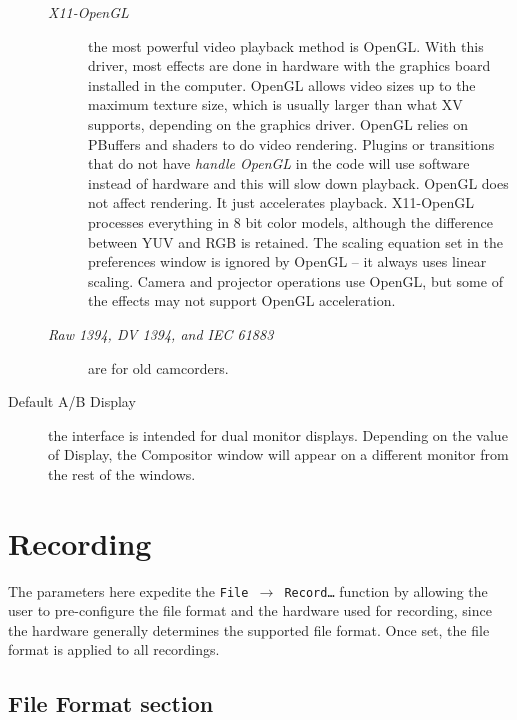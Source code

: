 \begin{description}
\begin{description}
        \item[\textit{X11-OpenGL}] the most powerful video playback method is OpenGL. With this driver, most effects are done in hardware with the graphics board installed in the computer. OpenGL allows video sizes up to the maximum texture size, which is usually larger than what XV supports, depending on the graphics driver.  OpenGL relies on PBuffers and shaders to do video rendering.  Plugins or transitions that do not  have \textit{handle OpenGL} in the code will use software instead of hardware and this will slow down playback.       
        OpenGL does not affect rendering. It just accelerates playback.  X11-OpenGL processes everything in 8 bit color models, although the difference between YUV and RGB is retained. The scaling equation set in the preferences window is ignored by OpenGL -- it always uses linear scaling. Camera and projector operations use OpenGL, but some of the effects may not support OpenGL acceleration.
        \item[\textit{Raw 1394, DV 1394, and IEC 61883}] are for old camcorders.
    \end{description}
    \item[Default A/B Display] the interface is intended for dual monitor displays. Depending on the value of Display, the Compositor window will appear on a different monitor from the rest of the windows.
\end{description}

\section{Recording}%
\label{sec:recording}

The parameters here expedite the \texttt{File $\rightarrow$ Record\dots} function by allowing the user to pre-configure the file format and the hardware used for recording, since the hardware generally determines the supported file format. Once set, the file format is applied to all recordings.

\subsection{File Format section}%
\label{sub:file_format_section}

